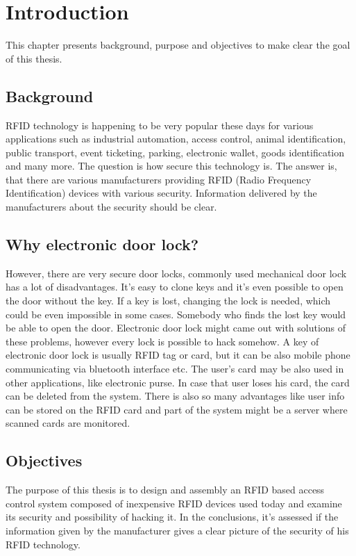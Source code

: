 \chapter{Introduction}
This chapter presents background, purpose and objectives to make clear the goal of this thesis.


\section{Background}
RFID technology is happening to be very popular these days for various applications such as industrial automation, access control, animal identification, public transport, event ticketing, parking, electronic wallet, goods identification and many more.
The question is how secure this technology is. The answer is, that there are various manufacturers providing RFID (Radio Frequency Identification) devices with various security. Information delivered by the manufacturers about the security should be clear.


\section{Why electronic door lock?}
However, there are very secure door locks, commonly used mechanical door lock has a lot of disadvantages. It's easy to clone keys and it's even possible to open the door without the key. If a key is lost, changing the lock is needed, which could be even impossible in some cases. Somebody who finds the lost key would be able to open the door.
Electronic door lock  might came out with solutions of these problems, however every lock is possible to hack somehow. 
A key of electronic door lock is usually RFID tag or card, but it can be also mobile phone communicating via bluetooth interface etc.
The user's card may be also used in other applications, like electronic purse.
In case that user loses his card, the card can be deleted from the system.
There is also so many advantages like user info can be stored on the RFID card and part of the system might be a server where scanned cards are monitored. 


\section{Objectives}
The purpose of this thesis is to design and assembly an RFID based access control system composed of inexpensive RFID devices used today and examine its security and possibility of hacking it. 
In the conclusions, it's assessed if the information given by the manufacturer gives a clear picture of the security of
his RFID technology.















